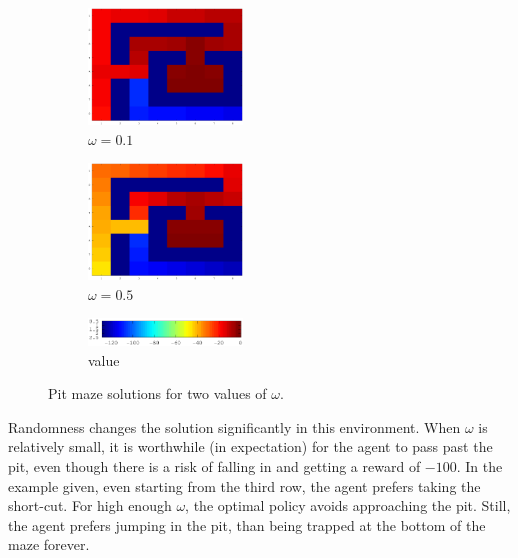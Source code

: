   \begin{figure}[H]
    \centering
    \begin{subfigure}{0.3\textwidth}
      \includegraphics[width=0.45\textwidth]{../figures/pit_random_0_1}
      \caption{$\omega = 0.1$}
    \end{subfigure}
    \begin{subfigure}{0.3\textwidth}
      \includegraphics[width=0.45\textwidth]{../figures/pit_random_0_5}
      \caption{$\omega = 0.5$}
    \end{subfigure}
    \begin{subfigure}{0.3\textwidth}
      \includegraphics[width=0.45\textwidth]{../figures/color-axis}
      \caption{value}
    \end{subfigure}
    \caption{Pit maze solutions for two values of $\omega$.}
    \label{fig:pit-solution}
  \end{figure}
Randomness changes the solution significantly in this environment. When $\omega$ is relatively small, it is worthwhile (in expectation) for the agent to pass past the pit, even though there is a risk of falling in and getting a reward of $-100$. In the example given, even starting from the third row, the agent prefers taking the short-cut. For high enough $\omega$, the optimal policy avoids approaching the pit. Still, the agent prefers jumping in the pit, than being trapped at the bottom of the maze forever.


